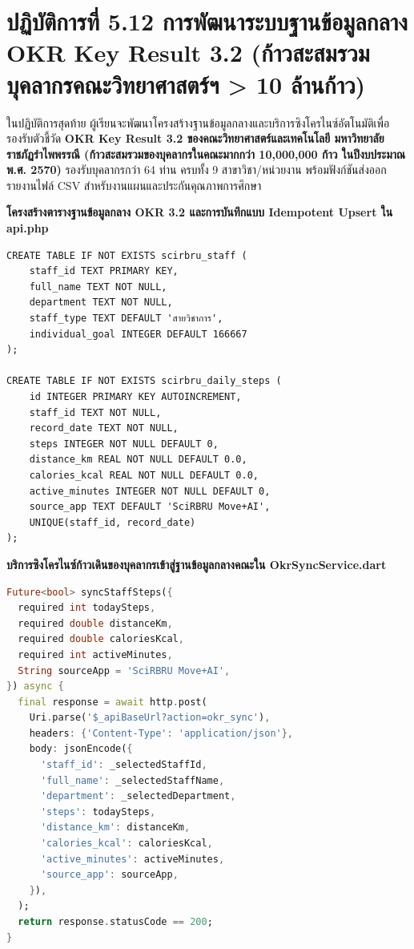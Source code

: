 \section{ปฏิบัติการที่ 5.12 การพัฒนาระบบฐานข้อมูลกลาง OKR Key Result 3.2 (ก้าวสะสมรวมบุคลากรคณะวิทยาศาสตร์ฯ > 10 ล้านก้าว)}
ในปฏิบัติการสุดท้าย ผู้เรียนจะพัฒนาโครงสร้างฐานข้อมูลกลางและบริการซิงโครไนซ์อัตโนมัติเพื่อรองรับตัวชี้วัด \textbf{OKR Key Result 3.2 ของคณะวิทยาศาสตร์และเทคโนโลยี มหาวิทยาลัยราชภัฏรำไพพรรณี (ก้าวสะสมรวมของบุคลากรในคณะมากกว่า 10,000,000 ก้าว ในปีงบประมาณ พ.ศ. 2570)} รองรับบุคลากรกว่า 64 ท่าน ครบทั้ง 9 สาขาวิชา/หน่วยงาน พร้อมฟังก์ชันส่งออกรายงานไฟล์ CSV สำหรับงานแผนและประกันคุณภาพการศึกษา

\begin{codebox}
\textbf{โครงสร้างตารางฐานข้อมูลกลาง OKR 3.2 และการบันทึกแบบ Idempotent Upsert ใน api.php}
\begin{lstlisting}
CREATE TABLE IF NOT EXISTS scirbru_staff (
    staff_id TEXT PRIMARY KEY,
    full_name TEXT NOT NULL,
    department TEXT NOT NULL,
    staff_type TEXT DEFAULT 'สายวิชาการ',
    individual_goal INTEGER DEFAULT 166667
);

CREATE TABLE IF NOT EXISTS scirbru_daily_steps (
    id INTEGER PRIMARY KEY AUTOINCREMENT,
    staff_id TEXT NOT NULL,
    record_date TEXT NOT NULL,
    steps INTEGER NOT NULL DEFAULT 0,
    distance_km REAL NOT NULL DEFAULT 0.0,
    calories_kcal REAL NOT NULL DEFAULT 0.0,
    active_minutes INTEGER NOT NULL DEFAULT 0,
    source_app TEXT DEFAULT 'SciRBRU Move+AI',
    UNIQUE(staff_id, record_date)
);
\end{lstlisting}
\end{codebox}

\begin{codebox}
\textbf{บริการซิงโครไนซ์ก้าวเดินของบุคลากรเข้าสู่ฐานข้อมูลกลางคณะใน OkrSyncService.dart}
\begin{lstlisting}[language=Dart]
Future<bool> syncStaffSteps({
  required int todaySteps,
  required double distanceKm,
  required double caloriesKcal,
  required int activeMinutes,
  String sourceApp = 'SciRBRU Move+AI',
}) async {
  final response = await http.post(
    Uri.parse('$_apiBaseUrl?action=okr_sync'),
    headers: {'Content-Type': 'application/json'},
    body: jsonEncode({
      'staff_id': _selectedStaffId,
      'full_name': _selectedStaffName,
      'department': _selectedDepartment,
      'steps': todaySteps,
      'distance_km': distanceKm,
      'calories_kcal': caloriesKcal,
      'active_minutes': activeMinutes,
      'source_app': sourceApp,
    }),
  );
  return response.statusCode == 200;
}
\end{lstlisting}
\end{codebox}

